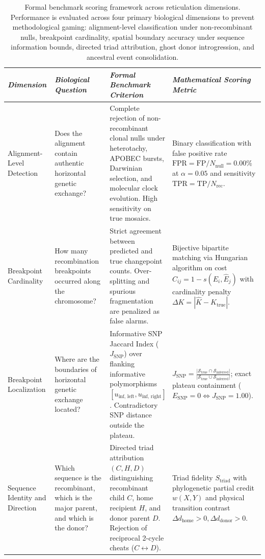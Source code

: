 \begin{table}[t!]
\caption{Formal benchmark scoring framework across reticulation dimensions. Performance is evaluated across four primary biological dimensions to prevent methodological gaming: alignment-level classification under non-recombinant nulls, breakpoint cardinality, spatial boundary accuracy under sequence information bounds, directed triad attribution, ghost donor introgression, and ancestral event consolidation.}
\label{tab:evaluation_framework}
\centering
\small
\begin{tabularx}{\textwidth}{>{\raggedright\arraybackslash}p{2.5cm} >{\raggedright\arraybackslash}p{3.2cm} Y Y}
\toprule
\textit{Dimension} & \textit{Biological Question} & \textit{Formal Benchmark Criterion} & \textit{Mathematical Scoring Metric} \\
\midrule
Alignment-Level Detection & Does the alignment contain authentic horizontal genetic exchange? & Complete rejection of non-recombinant clonal nulls under heterotachy, APOBEC bursts, Darwinian selection, and molecular clock evolution. High sensitivity on true mosaics. & Binary classification with false positive rate $\text{FPR} = \text{FP} / N_{\text{null}} = 0.00\%$ at $\alpha = 0.05$ and sensitivity $\text{TPR} = \text{TP} / N_{\text{rec}}$. \\
\addlinespace
Breakpoint Cardinality & How many recombination breakpoints occurred along the chromosome? & Strict agreement between predicted and true changepoint counts. Over-splitting and spurious fragmentation are penalized as false alarms. & Bijective bipartite matching via Hungarian algorithm on cost $C_{ij} = 1 - s(E_i, \hat{E}_j)$ with cardinality penalty $\Delta K = |\hat{K} - K_{\text{true}}|$. \\
\addlinespace
Breakpoint Localization & Where are the boundaries of horizontal genetic exchange located? & Informative SNP Jaccard Index ($J_{\text{SNP}}$) over flanking informative polymorphisms $[u_{\text{inf, left}}, u_{\text{inf, right}}]$. Contradictory SNP distance outside the plateau. & $J_{\text{SNP}} = \frac{|\mathcal{S}_{\text{true}} \cap \mathcal{S}_{\text{inferred}}|}{|\mathcal{S}_{\text{true}} \cup \mathcal{S}_{\text{inferred}}|}$; exact plateau containment ($E_{\text{SNP}} = 0 \iff J_{\text{SNP}} = 1.00$). \\
\addlinespace
Sequence Identity and Direction & Which sequence is the recombinant, which is the major parent, and which is the donor? & Directed triad attribution $(C, H, D)$ distinguishing recombinant child $C$, home recipient $H$, and donor parent $D$. Rejection of reciprocal 2-cycle cheats ($C \leftrightarrow D$). & Triad fidelity $S_{\text{triad}}$ with phylogenetic partial credit $w(X, Y)$ and physical transition contrast $\Delta d_{\text{home}} > 0, \Delta d_{\text{donor}} > 0$. \\

\end{tabularx}
\end{table}
